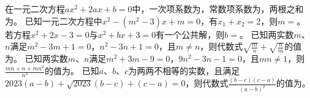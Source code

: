 \documentclass[10pt]{article}
\begin{document}
\begin{questions}{\selectingintroduction}
\begin{figure}[!ht]
{
        }
        \qquad\qquad\qquad
        \qquad\qquad\qquad
    \end{figure}
\end{questions}

\begin{questions}{\complitingintroduction}
    \question 在一元二次方程$ax^{2} + 2ax + b = 0$中，一次项系数为\complitingline{}，常数项系数为\complitingline{}，两根之和为\complitingline{}。
    \question 已知一元二次方程中$x^{2} - ( m^{2} - 3 )x + m = 0$，有$x_{1} + x_{2} = 2$，则$m =$\complitingline{}。
    \question 若方程$x^{2} + 2x - 3 = 0$与$x^{2} + bx + 3 = 0$有一个公共解，则$b =$\complitingline{}。
    \question 已知两实数$m$、$n$满足$m^2-3m+1=0$，$n^2-3n+1=0$，且$m \neq n$，则代数式$\sqrt{\frac{m}{n}}+\sqrt{\frac{n}{m}}$的值为\complitingline{}。
    \question 已知两实数$m$、$n$满足$m^2+3m-9=0$，$9n^2-3n-1=0$，且$mn \neq 1$，则$\frac{mn+n+mn^{2}}{n^{2}}$的值为\complitingline{}。
    \question 已知$a$、$b$、$c$为两两不相等的实数，且满足$2023(a-b)+\sqrt{2023}(b-c)+(c-a)=0$，则代数式$\frac{(b-c)(c-a)}{(a-b)^2}$的值为\complitingline{}。
\end{questions}
\end{document}
